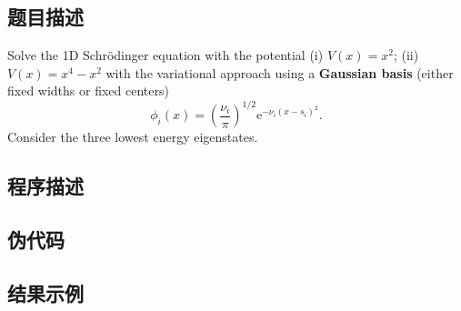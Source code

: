 \subsection{题目描述}
Solve the 1D Schrödinger equation with the potential (i) \( V(x) = x^2 \); (ii) \( V(x) = x^4 - x^2 \) with the variational approach using a \textbf{Gaussian basis} (either fixed widths or fixed centers)
\[
    \phi_i(x)=(\frac{\nu_i}\pi)^{1/2} \mathrm{e}^{-\nu_i(x-s_i)^2}.
\]
Consider the three lowest energy eigenstates.

\subsection{程序描述}

\subsection{伪代码}

\subsection{结果示例}
